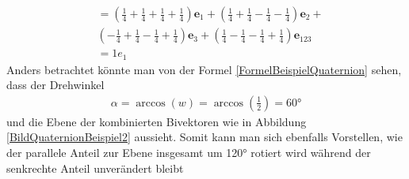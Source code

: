 \begin{beispiel}
\begin{align}
		&= (\textstyle{\frac{1}{4}} + \textstyle{\frac{1}{4}} + \textstyle{\frac{1}{4}} + \textstyle{\frac{1}{4}})\mathbf{e}_1 + (\textstyle{\frac{1}{4}} + \textstyle{\frac{1}{4}} - \textstyle{\frac{1}{4}} - \textstyle{\frac{1}{4}})\mathbf{e}_2 +\\ &(-\textstyle{\frac{1}{4}} + \textstyle{\frac{1}{4}} - \textstyle{\frac{1}{4}} + \textstyle{\frac{1}{4}})\mathbf{e}_3 + (\textstyle{\frac{1}{4}} - \textstyle{\frac{1}{4}} - \textstyle{\frac{1}{4}} + \textstyle{\frac{1}{4}})\mathbf{e}_{123}\\
		&= 1e_1 
	\end{align}
	Anders betrachtet könnte man von der Formel \eqref{FormelBeispielQuaternion} sehen, dass der Drehwinkel
	\begin{align}
		\alpha = \arccos(w) = \arccos(\textstyle{\frac{1}{2}}) = 60°
	\end{align}
	und die Ebene der kombinierten Bivektoren wie in Abbildung \ref{BildQuaternionBeispiel2} aussieht.
	Somit kann man sich ebenfalls Vorstellen, wie der parallele Anteil zur Ebene insgesamt um 120° rotiert wird während der senkrechte Anteil unverändert bleibt
\end{beispiel}


